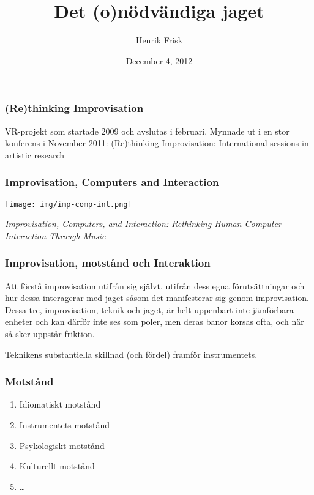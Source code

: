 \documentclass[ignorenonframetext]{beamer}
\title{Det (o)nödvändiga jaget}
\author{Henrik Frisk}
\date{December  4, 2012}
\begin{document}
\frame{\titlepage}

\begin{frame}[fragile]
\frametitle{(Re)thinking Improvisation}

VR-projekt som startade 2009 och avslutas i februari.
\vspace{0.5cm}
Mynnade ut i en stor konferens i November 2011: (Re)thinking Improvisation: International sessions in artistic research
\end{frame}

\begin{frame}
  \frametitle{Improvisation, Computers and Interaction}

  \begin{center}
    \texttt{[image: img/imp-comp-int.png]}
  \end{center}
  \begin{center}
    \emph{Improvisation, Computers, and Interaction: Rethinking Human-Computer Interaction Through Music}
  \end{center}

\end{frame}

\begin{frame}
  \frametitle{Improvisation, motstånd och Interaktion}
  
Att förstå improvisation utifrån sig självt, utifrån dess egna förutsättningar och hur dessa interagerar med jaget såsom det manifesterar sig genom improvisation. Dessa tre, improvisation, teknik och jaget, är helt uppenbart inte jämförbara enheter och kan därför inte ses som poler, men deras banor korsas ofta, och när så sker uppstår friktion.

\vspace{0.5cm}

Teknikens substantiella skillnad (och fördel) framför instrumentets.

\end{frame}

\begin{frame}
  \frametitle{Motstånd}
  \begin{enumerate}
  \item<1> Idiomatiskt motstånd
  \item<2> Instrumentets motstånd
  \item<3> Psykologiskt motstånd
  \item<4> Kulturellt motstånd
  \item<5> \ldots
  \end{enumerate}
\end{frame}
\end{document}
